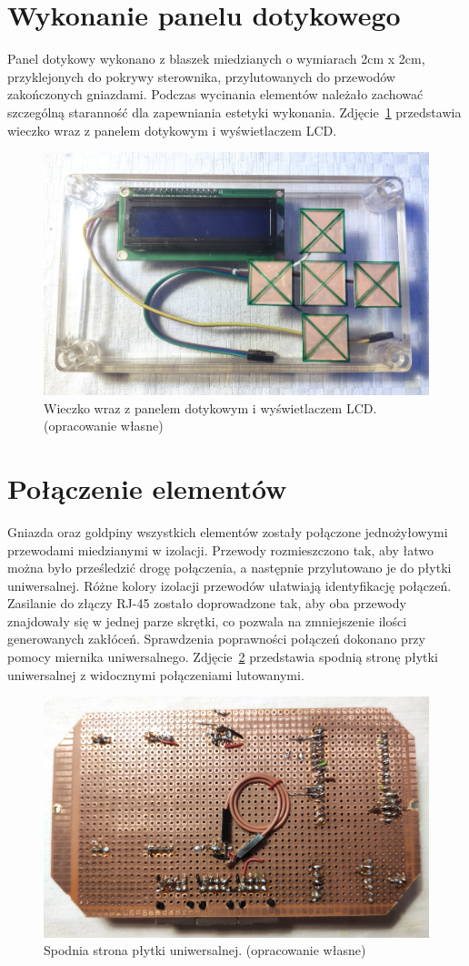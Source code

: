 \documentclass[11pt]{report}
\begin{document}
  \section{Wykonanie panelu dotykowego}
 Panel dotykowy wykonano z blaszek miedzianych o wymiarach 2cm x 2cm, przyklejonych do pokrywy sterownika, przylutowanych do przewodów zakończonych gniazdami. Podczas wycinania elementów należało zachować szczególną staranność dla zapewniania estetyki wykonania.
  Zdjęcie~\ref{fig:wieczko} przedstawia wieczko wraz z panelem dotykowym i wyświetlaczem LCD.
\begin{figure}[ht]
\centering
\includegraphics[width=0.8 \textwidth]{fig/wieczko.jpg}
\caption{Wieczko wraz z panelem dotykowym i wyświetlaczem LCD. (opracowanie własne)}
\label{fig:wieczko}
\end{figure}

 \section{Połączenie elementów}
 Gniazda oraz goldpiny wszystkich elementów zostały połączone jednożyłowymi przewodami miedzianymi w izolacji. Przewody rozmieszczono tak, aby łatwo można było prześledzić drogę połączenia, a następnie przylutowano je do płytki uniwersalnej. Różne kolory izolacji przewodów ułatwiają identyfikację połączeń. Zasilanie do złączy RJ-45 zostało doprowadzone tak, aby oba przewody znajdowały się w jednej parze skrętki, co pozwala na zmniejszenie ilości generowanych zakłóceń.
 Sprawdzenia poprawności połączeń dokonano przy pomocy miernika uniwersalnego.
   Zdjęcie~\ref{fig:uni_dol} przedstawia spodnią stronę płytki uniwersalnej z widocznymi połączeniami lutowanymi.
\begin{figure}[ht]
\centering
\includegraphics[width=0.8 \textwidth]{fig/plytka_dol.jpg}
\caption{Spodnia strona płytki uniwersalnej. (opracowanie własne)}
\label{fig:uni_dol}
\end{figure}
\end{document}
